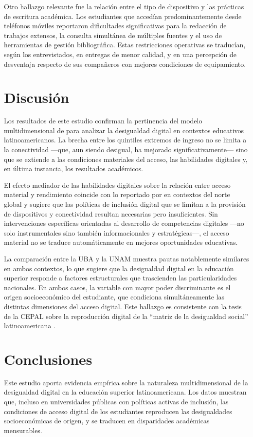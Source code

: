 \documentclass{article}
\begin{document}
Otro hallazgo relevante fue la relación entre el tipo de dispositivo y las prácticas de escritura académica. Los estudiantes que accedían predominantemente desde teléfonos móviles reportaron dificultades significativas para la redacción de trabajos extensos, la consulta simultánea de múltiples fuentes y el uso de herramientas de gestión bibliográfica. Estas restricciones operativas se traducían, según los entrevistados, en entregas de menor calidad, y en una percepción de desventaja respecto de sus compañeros con mejores condiciones de equipamiento.


\section{Discusión}
Los resultados de este estudio confirman la pertinencia del modelo multidimensional de \textcite{2563-VANDIJK2020} para analizar la desigualdad digital en contextos educativos latinoamericanos. La brecha entre los quintiles extremos de ingreso no se limita a la conectividad —que, aun siendo desigual, ha mejorado significativamente— sino que se extiende a las condiciones materiales del acceso, las habilidades digitales y, en última instancia, los resultados académicos.

El efecto mediador de las habilidades digitales sobre la relación entre acceso material y rendimiento coincide con lo reportado por \textcite{2565-HARGITTAI2002} en contextos del norte global y sugiere que las políticas de inclusión digital que se limitan a la provisión de dispositivos y conectividad resultan necesarias pero insuficientes. Sin intervenciones específicas orientadas al desarrollo de competencias digitales —no solo instrumentales sino también informacionales y estratégicas—, el acceso material no se traduce automáticamente en mejores oportunidades educativas.

La comparación entre la UBA y la UNAM muestra pautas notablemente similares en ambos contextos, lo que sugiere que la desigualdad digital en la educación superior responde a factores estructurales que trascienden las particularidades nacionales. En ambos casos, la variable con mayor poder discriminante es el origen socioeconómico del estudiante, que condiciona simultáneamente las distintas dimensiones del acceso digital. Este hallazgo es consistente con la tesis de la CEPAL sobre la reproducción digital de la “matriz de la desigualdad social” latinoamericana \autocite{2566-CEPAL2021}.


\section{Conclusiones}
Este estudio aporta evidencia empírica sobre la naturaleza multidimensional de la desigualdad digital en la educación superior latinoamericana. Los datos muestran que, incluso en universidades públicas con políticas activas de inclusión, las condiciones de acceso digital de los estudiantes reproducen las desigualdades socioeconómicas de origen, y se traducen en disparidades académicas mensurables.
\end{document}

